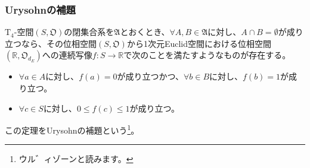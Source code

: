 \documentclass[dvipdfmx]{jsarticle}
\begin{document}
\subsubsection{Urysohnの補題}%
\begin{thm}[Urysohnの補題]\label{8.1.7.22}
$\mathrm{T}_{4}$-空間$\left( S,\mathfrak{O} \right)$の閉集合系を$\mathfrak{A}$とおくとき、$\forall A,B \in \mathfrak{A}$に対し、$A \cap B = \emptyset$が成り立つなら、その位相空間$\left( S,\mathfrak{O} \right)$から1次元Euclid空間における位相空間$\left( \mathbb{R},\mathfrak{O}_{d_{E}} \right)$への連続写像$f:S \rightarrow \mathbb{R}$で次のことを満たすようなものが存在する。
\begin{itemize}
\item
  $\forall a \in A$に対し、$f(a) = 0$が成り立つかつ、$\forall b \in B$に対し、$f(b) = 1$が成り立つ。
\item
  $\forall c \in S$に対し、$0 \leq f(c) \leq 1$が成り立つ。
\end{itemize}
この定理をUrysohnの補題という\footnote{ウル゛ィゾーンと読みます。}。
\end{thm}
\end{document}
